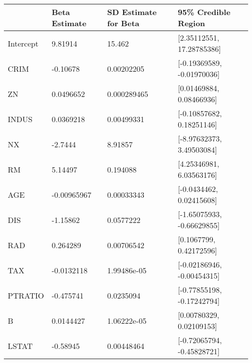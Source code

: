 \begin{tabular}{llll}
\hline
           & Beta Estimate   & SD Estimate for Beta   & 95\% Credible Region        \\
\hline
 Intercept & 9.81914         & 15.462                 & [2.35112551, 17.28785386]  \\
 CRIM      & -0.10678        & 0.00202205             & [-0.19369589, -0.01970036] \\
 ZN        & 0.0496652       & 0.000289465            & [0.01469884, 0.08466936]   \\
 INDUS     & 0.0369218       & 0.00499331             & [-0.10857682, 0.18251146]  \\
 NX        & -2.7444         & 8.91857                & [-8.97632373, 3.49503084]  \\
 RM        & 5.14497         & 0.194088               & [4.25346981, 6.03563176]   \\
 AGE       & -0.00965967     & 0.00033343             & [-0.0434462, 0.02415608]   \\
 DIS       & -1.15862        & 0.0577222              & [-1.65075933, -0.66629855] \\
 RAD       & 0.264289        & 0.00706542             & [0.1067799, 0.42172596]    \\
 TAX       & -0.0132118      & 1.99486e-05            & [-0.02186946, -0.00454315] \\
 PTRATIO   & -0.475741       & 0.0235094              & [-0.77855198, -0.17242794] \\
 B         & 0.0144427       & 1.06222e-05            & [0.00780329, 0.02109153]   \\
 LSTAT     & -0.58945        & 0.00448464             & [-0.72065794, -0.45828721] \\
\hline
\end{tabular}